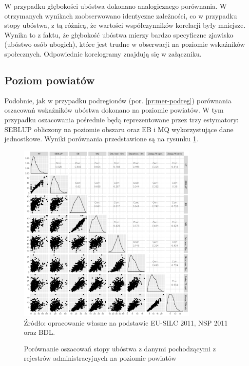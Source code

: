W przypadku głębokości ubóstwa dokonano analogicznego porównania. W otrzymanych wynikach zaobserwowano identyczne zależności, co w przypadku stopy ubóstwa, z tą różnicą, że wartości współczynników korelacji były mniejsze. Wynika to z faktu, że głębokość ubóstwa mierzy bardzo specyficzne zjawisko (ubóstwo osób ubogich), które jest trudne w obserwacji na poziomie wskaźników społecznych. Odpowiednie korelogramy znajdują się w załączniku.

\subsection{Poziom powiatów}

Podobnie, jak w przypadku podregionów (por. \ref{pr:mer-podreg}) porównania oszacowań wskaźników ubóstwa dokonano na poziomie powiatów. W tym przypadku oszacowania pośrednie będą reprezentowane przez trzy estymatory: SEBLUP obliczony na poziomie obszaru oraz EB i MQ wykorzystujące dane jednostkowe. Wyniki porównania przedstawione są na rysunku \ref{fig:hcr_pow_por}.

\begin{figure}[ht]
\caption{Porównanie oszacowań stopy ubóstwa z danymi pochodzącymi z rejestrów administracyjnych na poziomie powiatów}
\centering
\includegraphics[width=0.8\textwidth]{05_wykresy/hcr_pow_por-1.pdf}\\
\small{Źródło: opracowanie własne na podstawie EU-SILC 2011, NSP 2011 oraz BDL.}
\label{fig:hcr_pow_por}
\end{figure}

